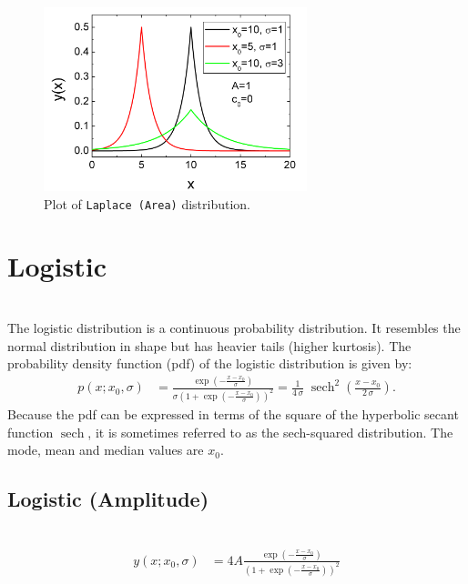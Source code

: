 \begin{figure}[htb]
\begin{center}
\includegraphics[width=0.6824\textwidth]{LaplaceArea.png}
\end{center}
\caption{Plot of \texttt{Laplace (Area)} distribution.}
\label{fig:LaplaceArea}
\end{figure}

\clearpage
\section{Logistic} ~\\
\label{sec:Logistic}
The logistic distribution is a continuous
probability distribution. It resembles the normal distribution in
shape but has heavier tails (higher kurtosis). The probability
density function (pdf) of the logistic  distribution is given by:
\begin{align}
p(x; x_0,\sigma) &= \frac{\exp\left(-\frac{x-x_0}{\sigma}\right)} {\sigma\left(1+\exp\left(-\frac{x-x_0}{\sigma}\right)\right)^2}
            =\frac{1}{4\,\sigma} \;\operatorname{sech}^2\!\left(\frac{x-x_0}{2\,\sigma}\right).
\end{align}
Because the pdf can be expressed in terms of the square of the
hyperbolic secant function $\operatorname{sech}$, it is sometimes referred to as
the sech-squared distribution. The mode, mean and median values are $x_0$.
\vspace{1cm}
\subsection{Logistic (Amplitude)} ~\\
\label{sec:LogisticAmplitude}
\begin{align}
y(x; x_0,\sigma) &= 4A\frac{\exp\left(-\frac{x-x_0}{\sigma}\right)} {\left(1+\exp\left(-\frac{x-x_0}{\sigma}\right)\right)^2}
\end{align}

